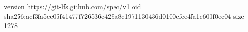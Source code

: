 version https://git-lfs.github.com/spec/v1
oid sha256:acf3fa5ec05f41477f726536c429a8c1971130436d0100cfee4fa1c600f0ec04
size 1278
